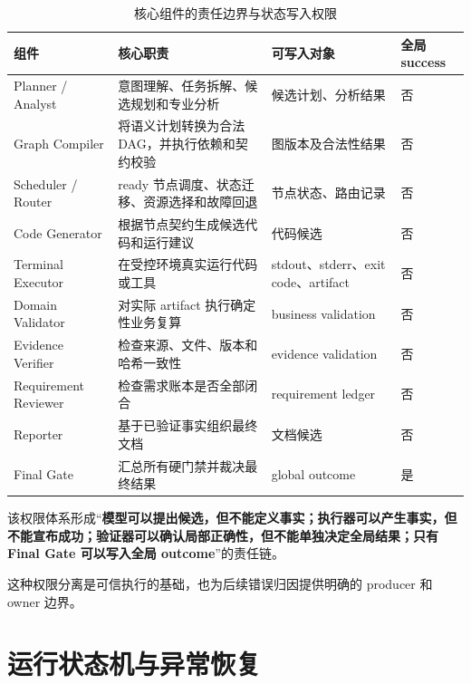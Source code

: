\documentclass[UTF8,a4paper,12pt,oneside]{ctexbook}
\begin{document}
\begin{table}[htbp]
\centering
\caption{核心组件的责任边界与状态写入权限}
\label{tab:component-permission}
\begin{tabularx}{0.97\textwidth}{p{}X p{}p{}}
\toprule
组件 & 核心职责 & 可写入对象 & 全局 success\\
\midrule
Planner / Analyst
& 意图理解、任务拆解、候选规划和专业分析
& 候选计划、分析结果
& 否\\

Graph Compiler
& 将语义计划转换为合法 DAG，并执行依赖和契约校验
& 图版本及合法性结果
& 否\\

Scheduler / Router
& ready 节点调度、状态迁移、资源选择和故障回退
& 节点状态、路由记录
& 否\\

Code Generator
& 根据节点契约生成候选代码和运行建议
& 代码候选
& 否\\

Terminal Executor
& 在受控环境真实运行代码或工具
& stdout、stderr、exit code、artifact
& 否\\

Domain Validator
& 对实际 artifact 执行确定性业务复算
& business validation
& 否\\

Evidence Verifier
& 检查来源、文件、版本和哈希一致性
& evidence validation
& 否\\

Requirement Reviewer
& 检查需求账本是否全部闭合
& requirement ledger
& 否\\

Reporter
& 基于已验证事实组织最终文档
& 文档候选
& 否\\

Final Gate
& 汇总所有硬门禁并裁决最终结果
& global outcome
& 是\\
\bottomrule
\end{tabularx}
\end{table}

该权限体系形成“\textbf{模型可以提出候选，但不能定义事实；执行器可以产生事实，但不能宣布成功；验证器可以确认局部正确性，但不能单独决定全局结果；只有 Final Gate 可以写入全局 outcome}”的责任链。

这种权限分离是可信执行的基础，也为后续错误归因提供明确的 producer 和 owner 边界。


\section{运行状态机与异常恢复}
\end{document}
